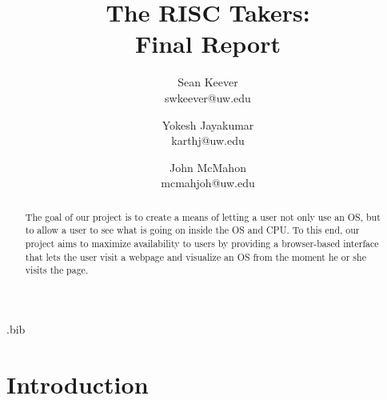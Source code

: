 \usepackage{filecontents}
\raggedbottom

\usepackage{graphicx}
\usepackage{float}
\graphicspath{ {../images/}}

\begin{filecontents}{\jobname.bib}

\end{filecontents}



\date{}

\title{\Large \bf The RISC Takers:\\
  Final Report}

\author{
  {\rm Sean Keever} \\
  swkeever@uw.edu
  \and
  {\rm Yokesh Jayakumar} \\
  karthj@uw.edu
  \and
  {\rm John McMahon} \\
  mcmahjoh@uw.edu
} %

\maketitle

\begin{abstract}
  The goal of our project is to create a means of letting a user not only use an OS,
  but to allow a user to see what is going on inside the OS and CPU.
  To this end, our project aims to maximize availability to users by
  providing a browser-based interface that lets the user visit a webpage and
  visualize an OS from the moment he or she visits the page.
\end{abstract}

\section{Introduction}

